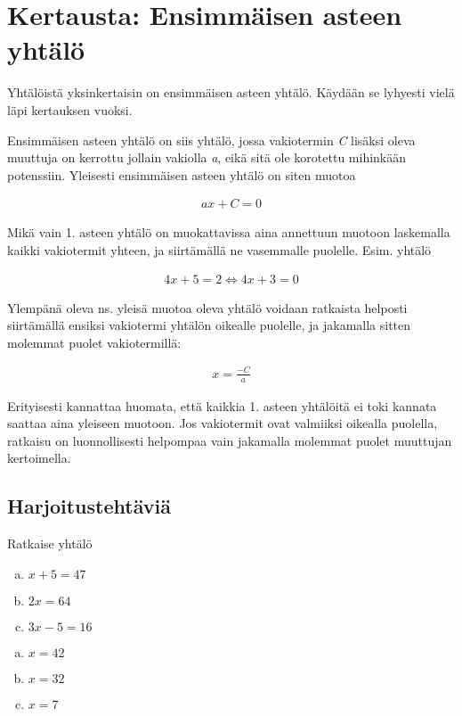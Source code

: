 \chapter{Kertausta: Ensimmäisen asteen yhtälö}

Yhtälöistä yksinkertaisin on ensimmäisen asteen yhtälö. Käydään se lyhyesti
vielä läpi kertauksen vuoksi.

Ensimmäisen asteen yhtälö on siis yhtälö, jossa vakiotermin \emph{C} lisäksi
oleva muuttuja on kerrottu jollain vakiolla \emph{a}, eikä sitä ole korotettu
mihinkään potenssiin. Yleisesti ensimmäisen asteen yhtälö on siten muotoa

\begin{align*}
    ax + C = 0
\end{align*}

Mikä vain 1. asteen yhtälö on muokattavissa aina
annettuun muotoon laskemalla kaikki vakiotermit yhteen,
ja siirtämällä ne vasemmalle puolelle. Esim. yhtälö

\begin{align*}
    4x + 5 = 2 \Leftrightarrow 4x + 3 = 0
\end{align*}

Ylempänä oleva ns. yleisä muotoa oleva yhtälö voidaan ratkaista helposti siirtämällä
ensiksi vakiotermi yhtälön oikealle puolelle, ja jakamalla sitten molemmat puolet vakiotermillä:

\begin{align*}
    x = \frac{-C}{a}
\end{align*}

Erityisesti kannattaa huomata, että kaikkia 1. asteen yhtälöitä ei toki
kannata saattaa aina yleiseen muotoon. Jos vakiotermit ovat valmiiksi oikealla
puolella, ratkaisu on luonnollisesti helpompaa vain jakamalla molemmat puolet
muuttujan kertoimella.

\section{Harjoitustehtäviä}

\begin{tehtava}
  Ratkaise yhtälö
  \begin{enumerate}[a)]
    \item $x + 5 = 47$
    \item $2x = 64$
    \item $3x - 5 = 16$
  \end{enumerate}

  \begin{vastaus}
    \begin{enumerate}[a)]
      \item $x = 42$
      \item $x = 32$
      \item $x = 7$
    \end{enumerate}
  \end{vastaus}
\end{tehtava}

